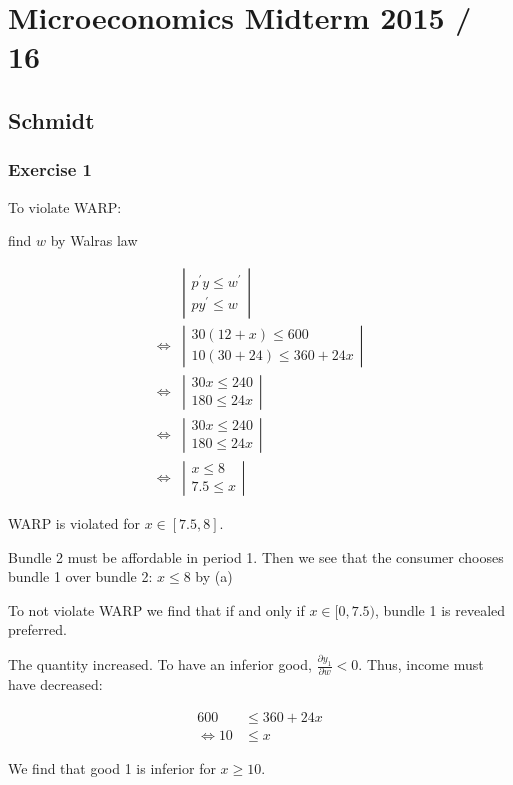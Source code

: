 \section{Microeconomics Midterm 2015 / 16}

{
\subsection*{Schmidt}

\subsubsection*{Exercise 1}

\begin{enumerate}[label=(\alph*)]
{\item 
To violate WARP:

find $w$ by Walras law

$$
\begin{aligned}
& \left|\begin{array}{l}
p^{\prime} y \leqslant w^{\prime} \\
p y^{\prime} \leqslant w
\end{array}\right| \\
\Leftrightarrow&\left|\begin{array}{l}
30(12+x) \leqslant 600 \\
10(30+24) \leqslant 360+24 x
\end{array}\right| \\
\Leftrightarrow& \left|\begin{array}{l}
30 x \leqslant 240 \\
180 \leqslant 24 x
\end{array}\right| \\
\Leftrightarrow& \left|\begin{array}{l}
30 x \leqslant 240 \\
180 \leqslant 24 x
\end{array}\right| \\
\Leftrightarrow& \left|\begin{array}{c}
x \leqslant 8 \\
7.5 \leqslant x
\end{array}\right|
\end{aligned}
$$

WARP is violated for $x \in[7.5,8]$.
}
{\item
Bundle 2 must be affordable in period 1. Then we see that the consumer chooses bundle 1 over bundle 2: $x \leqslant 8$ by (a)

To not violate WARP we find that if and only if $x \in[0,7.5)$, bundle 1 is revealed preferred.
}
{\item 
The quantity increased. To have an inferior good, $\frac{\partial y_{1}}{\partial w}<0$. Thus, income must have decreased:

$$
\begin{aligned}
600 & \leqslant 360+24 x \\
\Leftrightarrow 10 & \leqslant x
\end{aligned}
$$

We find that good 1 is inferior for $x \geqslant 10$.
}
\end{enumerate}
}
